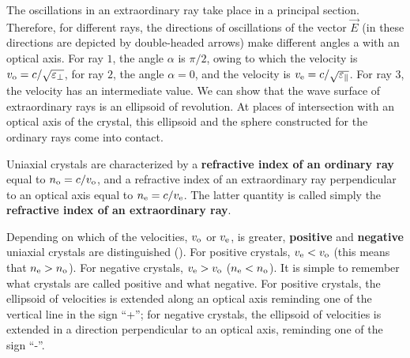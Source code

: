 The oscillations in an extraordinary ray take place in a principal section.
Therefore, for different rays, the directions of oscillations of the vector $\vec{E}$ (in  these directions are depicted by double-headed arrows) make different angles a with an optical axis.
For ray $1$, the angle $\alpha$ is $\pi/2$, owing to which the velocity is $v_{\text{o}}=c/\sqrt{\varepsilon_{\perp}}$, for ray $2$, the angle $\alpha=0$, and the velocity is $v_{\text{e}}= c/\sqrt{\varepsilon_{\parallel}}$.
For ray $3$, the velocity has an intermediate value.
We can show that the wave surface of extraordinary rays is an ellipsoid of revolution.
At places of intersection with an optical axis of the crystal, this ellipsoid and the sphere constructed for the ordinary rays come into contact.

Uniaxial crystals are characterized by a \textbf{refractive index of an ordinary ray} equal to $n_{\text{o}}=c/v_{\text{o}}$, and a refractive index of an extraordinary ray perpendicular to an optical axis equal to $n_{\text{e}}=c/v_{\text{e}}$.
The latter quantity is called simply the \textbf{refractive index of an extraordinary
ray}.

Depending on which of the velocities, $v_{\text{o}}$ or $v_{\text{e}}$, is greater, \textbf{positive} and \textbf{negative} uniaxial crystals are distinguished ().
For positive crystals, $v_{\text{e}}<v_{\text{o}}$ (this means that $n_{\text{e}}>n_{\text{o}}$).
For negative crystals, $v_{\text{e}}>v_{\text{o}}$ ($n_{\text{e}}<n_{\text{o}}$).
It is simple to remember what crystals are called positive and what negative.
For positive crystals, the ellipsoid of velocities is extended along an optical axis reminding one of the vertical line in the sign ``+''; for negative crystals, the ellipsoid of velocities is extended in a direction perpendicular to an optical axis, reminding one of the sign ``-''.

